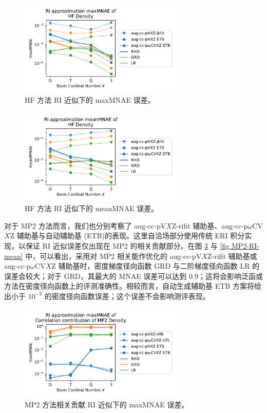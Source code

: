 \begin{figure}[t]
  \centering
  \caption{HF 方法 RI 近似下的 maxMNAE 误差。}
  \label{fig.HF-RI-err}
  \includegraphics[width=0.7\textwidth]{assets/HF-RI-err.pdf}
\end{figure}

\begin{figure}[t]
  \centering
  \caption{HF 方法 RI 近似下的 meanMNAE 误差。}
  \label{fig.HF-RI-mean}
  \includegraphics[width=0.7\textwidth]{assets/HF-RI-mean.pdf}
\end{figure}

对于 MP2 方法而言，我们也分别考察了 aug-cc-pV$X$Z-rifit 辅助基\cite{Weigend-Haettig.JCP.2002}、aug-cc-p$\omega$CV$X$Z 辅助基\cite{10.1039/b415208e}与自动辅助基 (ETB)\cite{Stoychev-Neese.JCTC.2017}的表现。这里自洽场部分使用传统 ERI 积分实现，以保证 RI 近似误差仅出现在 MP2 的相关贡献部分。在图 \ref{fig.MP2-RI-err} 与 \ref{fig.MP2-RI-mean} 中，可以看出，采用对 MP2 相关能作优化的 aug-cc-pV$X$Z-rifit 辅助基或 aug-cc-p$\omega$CV$X$Z 辅助基时，密度梯度径向函数 GRD 与二阶梯度径向函数 LR 的误差会较大；对于 GRD，其最大的 MNAE 误差可以达到 0.9；这将会影响泛函或方法在密度径向函数上的评测准确性。相较而言，自动生成辅助基 ETB 方案将给出小于 $10^{-3}$ 的密度径向函数误差；这个误差不会影响测评表现。

\begin{figure}[t]
  \centering
  \caption{MP2 方法相关贡献 RI 近似下的 maxMNAE 误差。}
  \label{fig.MP2-RI-err}
  \includegraphics[width=0.7\textwidth]{assets/MP2-RI-err.pdf}
\end{figure}

